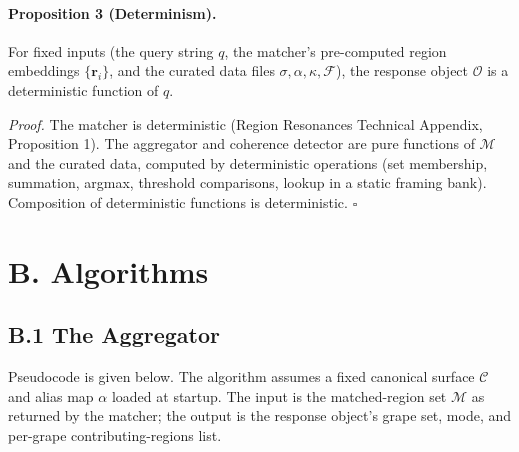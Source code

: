 \documentclass[11pt]{article}
\begin{document}
\paragraph{Proposition 3 (Determinism).}
For fixed inputs (the query string $q$, the matcher's pre-computed region embeddings $\{ \mathbf{r}_i \}$, and the curated data files $\sigma, \alpha, \kappa, \mathcal{F}$), the response object $\mathcal{O}$ is a deterministic function of $q$.

\emph{Proof.} The matcher is deterministic (Region Resonances Technical Appendix, Proposition 1). The aggregator and coherence detector are pure functions of $\mathcal{M}$ and the curated data, computed by deterministic operations (set membership, summation, argmax, threshold comparisons, lookup in a static framing bank). Composition of deterministic functions is deterministic. $\square$

\section*{B. Algorithms}

\subsection*{B.1 The Aggregator}

Pseudocode is given below. The algorithm assumes a fixed canonical surface $\mathcal{C}$ and alias map $\alpha$ loaded at startup. The input is the matched-region set $\mathcal{M}$ as returned by the matcher; the output is the response object's grape set, mode, and per-grape contributing-regions list.
\end{document}
